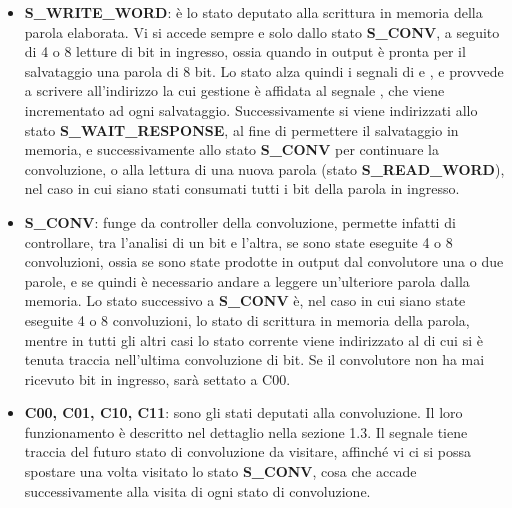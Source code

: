 \begin{itemize}
    \item \textbf{S\_WRITE\_WORD}: è lo stato deputato alla scrittura in memoria della parola elaborata. Vi si accede sempre e solo dallo stato \textbf{S\_CONV}, a seguito di 4 o 8 letture di bit in ingresso, ossia quando in output è pronta per il salvataggio una parola di 8 bit. Lo stato alza quindi i segnali di  e , e provvede a scrivere all’indirizzo la cui gestione è affidata al segnale , che viene incrementato ad ogni salvataggio. Successivamente si viene indirizzati allo stato \textbf{S\_WAIT\_RESPONSE}, al fine di permettere il salvataggio in memoria, e successivamente allo stato \textbf{S\_CONV} per continuare la convoluzione, o alla lettura di una nuova parola (stato \textbf{S\_READ\_WORD}), nel caso in cui siano stati consumati tutti i bit della parola in ingresso.
    
    \item \textbf{S\_CONV}: funge da controller della convoluzione, permette infatti di controllare, tra l’analisi di un bit e l’altra, se sono state eseguite 4 o 8 convoluzioni, ossia se sono state prodotte in output dal convolutore una o due parole, e se quindi è necessario andare a leggere un’ulteriore parola dalla memoria. Lo stato successivo a \textbf{S\_CONV} è, nel caso in cui siano state eseguite 4 o 8 convoluzioni, lo stato di scrittura in memoria della parola, mentre in tutti gli altri casi lo stato corrente viene indirizzato al  di cui si è tenuta traccia nell’ultima convoluzione di bit. Se il convolutore non ha mai ricevuto bit in ingresso,  sarà settato a C00.
    
    \item \textbf{C00, C01, C10, C11}: sono gli stati deputati alla convoluzione. Il loro funzionamento è descritto nel dettaglio nella sezione 1.3. Il segnale  tiene traccia del futuro stato di convoluzione da visitare, affinché vi ci si possa spostare una volta visitato lo stato \textbf{S\_CONV}, cosa che accade successivamente alla visita di ogni stato di convoluzione.
    
\end{itemize}